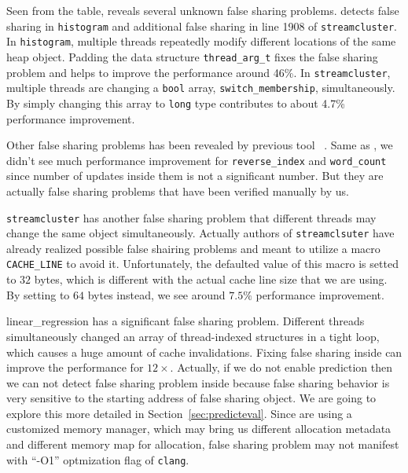 Seen from the table, \Predator{} reveals several unknown false sharing problems. \Predator{} detects 
false sharing in \texttt{histogram} and additional false sharing in line 1908 of
\texttt{streamcluster}. 
In \texttt{histogram}, multiple threads repeatedly modify different locations of the same heap object. 
Padding the data structure \texttt{thread\_arg\_t} fixes the false sharing problem and 
helps to improve the performance around 46\%.
In \texttt{streamcluster}, multiple threads are changing a \texttt{bool} array, \texttt{switch\_membership}, simultaneously. By simply changing this array to \texttt{long} type contributes to about 4.7\% performance improvement. 

Other false sharing problems has been revealed by previous tool \sheriff{}~\cite{sheriff}. 
Same as \sheriff{}, we didn't see much performance improvement for \texttt{reverse\_index} and 
\texttt{word\_count} since number of updates inside them is not a significant number. But they
are actually false sharing problems that have been verified manually by us.

\texttt{streamcluster} has another false sharing problem that different threads 
may change the same object simultaneously. 
Actually authors of \texttt{streamclsuter} have already realized possible
false shairing problems and meant to utilize a macro \texttt{CACHE\_LINE} to avoid it. Unfortunately,
the defaulted value of this macro is setted to $32$ bytes, which is different with the actual
cache line size that we are using. By setting to $64$ bytes instead, we see around $7.5\%$ performance
improvement.

linear\_regression has a significant false sharing problem. 
Different threads simultaneously changed an array of thread-indexed structures in a tight
loop, which causes a huge amount of cache invalidations. 
Fixing false sharing inside can improve the performance for $12\times$. 
Actually, if we do not enable prediction then 
we can not detect false sharing problem inside because false sharing behavior is 
very sensitive to the starting address of false sharing object. 
We are going to explore this more detailed in Section~\ref{sec:predicteval}.
Since \Predator{} are using a customized memory manager, which may
bring us different allocation metadata and different memory map for allocation,
false sharing problem may not manifest with ``-O1'' optmization flag of \texttt{clang}.

